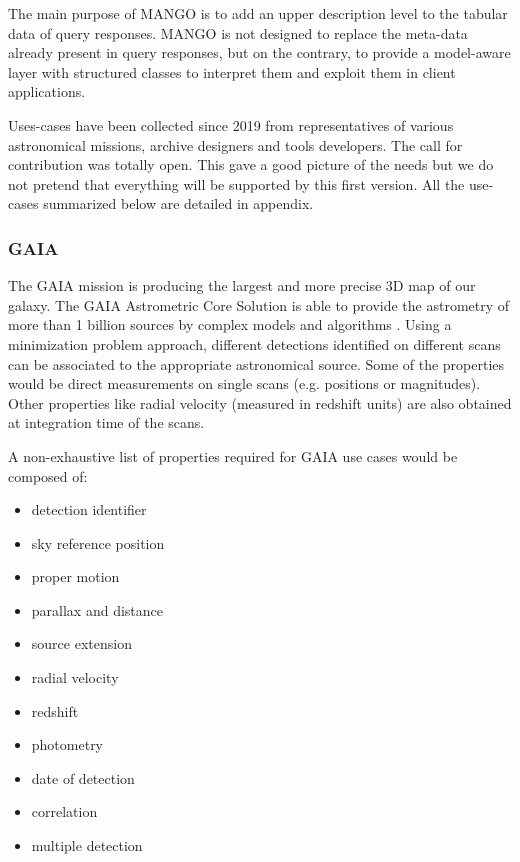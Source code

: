 The main purpose of MANGO is to add an upper description level to the tabular data of query responses.
MANGO is not designed to replace the meta-data already present in query responses, but on the contrary, 
to provide a model-aware layer with structured classes to interpret them and exploit them in client applications. 

Uses-cases have been collected since 2019 from representatives of various astronomical 
missions, archive designers and tools developers.
The call for contribution was totally open. This gave a good picture of the needs but we do not pretend 
that everything will be supported by this first version.
All the use-cases summarized below are detailed in appendix.

\subsubsection{GAIA}
The GAIA mission is producing the largest and more precise 3D map of our galaxy.
The GAIA Astrometric Core Solution is able to provide the astrometry of more than 1
billion sources by complex models and algorithms \citep{2012A&A...538A..78L}.
Using a minimization problem approach, different detections identified on
different scans can be associated to the appropriate astronomical source. Some of the
properties would be direct measurements on single scans (e.g. positions or
magnitudes). Other properties like radial velocity (measured in redshift
units) are also obtained at integration time of the scans.

A non-exhaustive list of properties required for GAIA use cases would be composed
of:

\begin{itemize}[noitemsep,topsep=0pt,parsep=0pt,partopsep=0pt]
    \item detection identifier
    \item sky reference position
    \item proper motion
    \item parallax and distance

    \item source extension
    \item radial velocity
    \item redshift
    \item photometry
    \item date of detection
    \item correlation
    \item multiple detection
\end{itemize}

